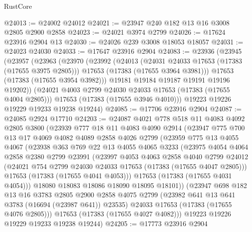 \begin{lexlean}{RustCore}
\begin{coremodule}
@24013 := @24002 @24012
@24021 := @23947 @240 @182 @13 @16 @3008 @2805 @2900 @2858
@24023 := @24021 @3974 @2799
@24026 := @17624 @23916 @2904 @13
@24030 := @24026 @239 @3008 @18053 @18057
@24031 := @24023 @24030
@24033 := @17647 @23916 @2904
@24083 := @23936
    (@23945
      (@23957
        (@23963
          (@23970
            (@23992
              (@24013
                (@24031 @24033 @17653 (@17383 (@17655 @3975 @2805)))
                @17653
                (@17383 (@17655 @3964 @3981)))
              @17653
              (@17383 (@17655 @3954 @3982)))
            @19181
            @19184
            @19187
            @19191
            @19196
            @19202))
        (@24021 @4003 @2799 @24030 @24033 @17653 (@17383 (@17655 @4004 @2805)))
        @17653
        (@17383 (@17655 @3946 @4010)))
      @19223
      @19226
      @19229
      @19233
      @19238
      @19244)
@24085 := @17706 @23916 @2904
@24087 := @24085 @2924 @17710
@24203 := @24087
    @4021
    @778
    @518
    @11
    @4083
    @4092
    @2805
    @3800
    (@23939
      @777
      @18
      @11
      @4083
      @4090
      @2914
      (@23947
        @775
        @700
        @13
        @17
        @4069
        @4082
        @4089
        @2858
        @4026
        @2799
        (@23959
          @775
          @13
          @4055
          @4067
          (@23938
            @363
            @769
            @22
            @13
            @4055
            @4065
            @3233
            (@23975
              @4054
              @4064
              @2858
              @2380
              @2799
              @23991
              (@23997
                @4053
                @4063
                @2858
                @4040
                @2799
                @24012
                (@24021 @754 @2799 @24030 @24033 @17653 (@17383 (@17655 @4047 @2805)))
                @17653
                (@17383 (@17655 @4041 @4053)))
              @17653
              (@17383 (@17655 @4031 @4054)))
            @18080
            @18083
            @18086
            @18090
            @18095
            @18101))
        (@23947
          @698
          @182
          @13
          @16
          @3783
          @2805
          @2900
          @2858
          @4075
          @2799
          (@23982 @641 @13 @641 @3783 (@16694 (@23987 @641)) @23535)
          @24033
          @17653
          (@17383 (@17655 @4076 @2805)))
        @17653
        (@17383 (@17655 @4027 @4082)))
      @19223
      @19226
      @19229
      @19233
      @19238
      @19244)
@24205 := @17773 @23916 @2904

\end{coremodule}
\end{lexlean}

